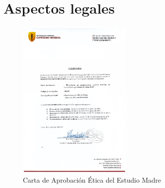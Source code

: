 \appendix
\clearpage
\addappheadtotoc
\appendixpage
\chapter{Aspectos legales}

\begin{figure}[h]
\centering
    \includegraphics[width=0.5\textwidth]{imagenes/EM_AprobacionEtica.jpg}
    \caption{Carta de Aprobación Ética del Estudio Madre}
    \label{EM_apet}
\end{figure}


